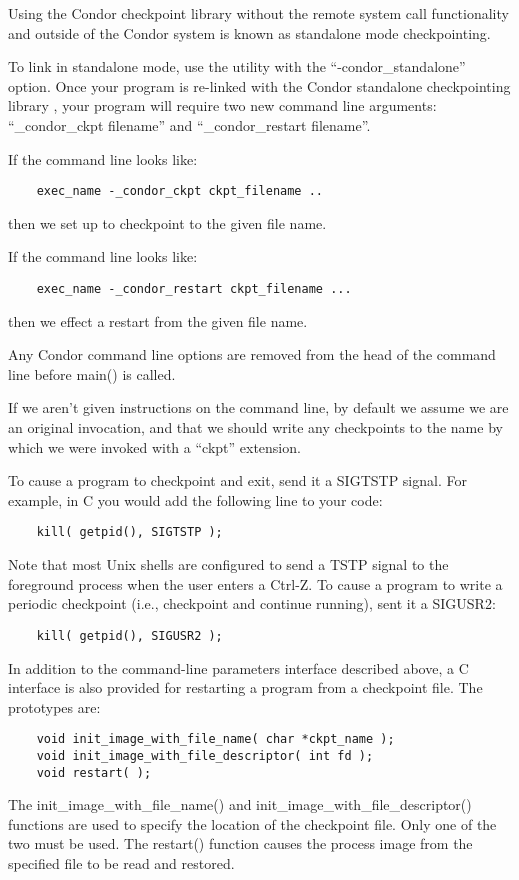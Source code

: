 Using the Condor checkpoint library without the remote system call
functionality and outside of the Condor system is known as standalone
mode checkpointing.

To link in standalone mode, use the  utility with the
``-condor\_standalone'' option.
Once your program is re-linked with the Condor standalone
checkpointing library , your program will
require two new command line arguments: ``\_condor\_ckpt filename''
and ``\_condor\_restart filename''.

If the command line looks like:

\begin{verbatim}
	exec_name -_condor_ckpt ckpt_filename ..
\end{verbatim}

then we set up to checkpoint to the given file name.

If the command line looks like:

\begin{verbatim}
	exec_name -_condor_restart ckpt_filename ...
\end{verbatim}

then we effect a restart from the given file name.

Any Condor command line options are removed from the head of the
command line before main() is called.

If we aren't given instructions on the command line, by default we
assume we are an original invocation, and that we should write any
checkpoints to the name by which we were invoked with a
``ckpt'' extension.

To cause a program to checkpoint and exit, send it a SIGTSTP signal.  For 
example, in C you would add the following line to your code:

\begin{verbatim}
	kill( getpid(), SIGTSTP );
\end{verbatim}

Note that most Unix shells are configured to send a TSTP signal to the
foreground process when the user enters a Ctrl-Z.  To cause a program
to write a periodic checkpoint (i.e., checkpoint and continue
running), sent it a SIGUSR2:

\begin{verbatim}
	kill( getpid(), SIGUSR2 );
\end{verbatim}

In addition to the command-line parameters interface described above,
a C interface is also provided for restarting a program from a
checkpoint file.  The prototypes are:

\begin{verbatim}
	void init_image_with_file_name( char *ckpt_name );
	void init_image_with_file_descriptor( int fd );
	void restart( );
\end{verbatim}

The init\_image\_with\_file\_name() and
init\_image\_with\_file\_descriptor() functions are used to specify
the location of the checkpoint file.  Only one of the two must be
used.  The restart() function causes the process image from the
specified file to be read and restored.
